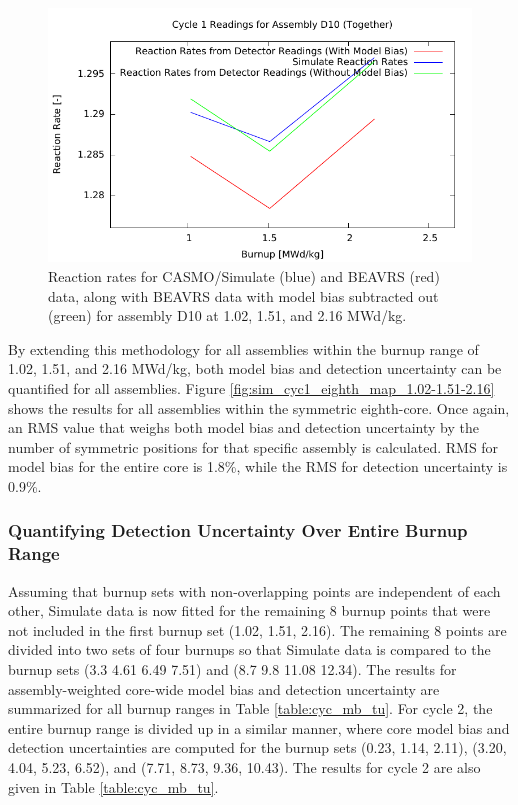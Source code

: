 \documentclass{article}
\begin{document}
\begin{figure}[!htb]
\centering
\includegraphics[keepaspectratio, width = 4.5 in]{figures/D10_together}
\caption{Reaction rates for CASMO/Simulate (blue) and BEAVRS (red) data, along with BEAVRS data with model bias subtracted out (green) for assembly D10 at 1.02, 1.51, and 2.16 MWd/kg.}
\label{fig:sim_D10_together}
\end{figure}

By extending this methodology for all assemblies within the burnup range of 1.02, 1.51, and 2.16 MWd/kg, both model bias and detection uncertainty can be quantified for all assemblies. Figure \ref{fig:sim_cyc1_eighth_map_1.02-1.51-2.16} shows the results for all assemblies within the symmetric eighth-core. Once again, an RMS value that weighs both model bias and detection uncertainty by the number of symmetric positions for that specific assembly is calculated. RMS for model bias for the entire core is 1.8\%, while the RMS for detection uncertainty is 0.9\%. 



\subsubsection{Quantifying Detection Uncertainty Over Entire Burnup Range}\label{sec:cassim_timedep_uq}

Assuming that burnup sets with non-overlapping points are independent of each other, Simulate data is now fitted for the remaining 8 burnup points that were not included in the first burnup set (1.02, 1.51, 2.16). The remaining 8 points are divided into two sets of four burnups so that Simulate data is compared to the burnup sets (3.3 4.61 6.49 7.51) and (8.7 9.8 11.08 12.34). The results for assembly-weighted core-wide model bias and detection uncertainty are summarized for all burnup ranges in Table \ref{table:cyc_mb_tu}. For cycle 2, the entire burnup range is divided up in a similar manner, where core model bias and detection uncertainties are computed for the burnup sets (0.23, 1.14, 2.11), (3.20, 4.04, 5.23, 6.52), and (7.71, 8.73, 9.36, 10.43). The results for cycle 2 are also given in Table \ref{table:cyc_mb_tu}.
\end{document}
